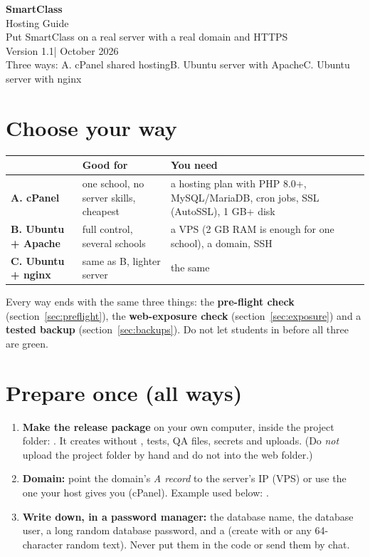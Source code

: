 \documentclass[11pt,a4paper]{article}
\newcommand{\manualversion}{1.1}
\begin{document}
\begin{titlepage}
\centering\sffamily
\vspace*{3cm}
{\Huge\bfseries\color{brand} SmartClass}\\[6pt]
{\LARGE Hosting Guide}\\[1.2cm]
{\large Put SmartClass on a real server with a real domain and HTTPS}\\[1cm]
{\large Version \manualversion\quad| October 2026}\\[3cm]
{\small Three ways: A. cPanel shared hosting\quad B. Ubuntu server with Apache\quad C. Ubuntu server with nginx}
\end{titlepage}
\tableofcontents\clearpage

\section{Choose your way}
\begin{tabular}{@{}p{3.1cm}p{5.6cm}p{5.3cm}@{}}
\toprule & \textbf{Good for} & \textbf{You need}\\\midrule
\textbf{A. cPanel} & one school, no server skills, cheapest & a hosting plan with PHP 8.0+, MySQL/MariaDB, cron jobs, SSL (AutoSSL), 1 GB+ disk\\
\textbf{B. Ubuntu + Apache} & full control, several schools & a VPS (2 GB RAM is enough for one school), a domain, SSH\\
\textbf{C. Ubuntu + nginx} & same as B, lighter server & the same\\
\bottomrule\end{tabular}

Every way ends with the same three things: the \textbf{pre-flight check} (section~\ref{sec:preflight}), the \textbf{web-exposure check} (section~\ref{sec:exposure}) and a \textbf{tested backup} (section~\ref{sec:backups}). Do not let students in before all three are green.

\section{Prepare once (all ways)}
\begin{enumerate}
\item \textbf{Make the release package} on your own computer, inside the project folder: . It creates  without , tests, QA files, secrets and uploads. (Do \emph{not} upload the project folder by hand and do not  into the web folder.)
\item \textbf{Domain:} point the domain's \emph{A record} to the server's IP (VPS) or use the one your host gives you (cPanel). Example used below: .
\item \textbf{Write down, in a password manager:} the database name, the database user, a long random database password, and a  (create with  or any 64-character random text). Never put them in the code or send them by chat.
\end{enumerate}
\end{document}
